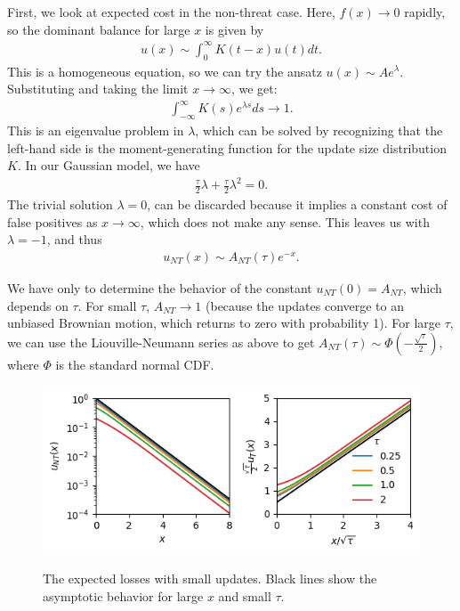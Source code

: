 \documentclass[12pt, letterpaper]{article}
\begin{document}
First, we look at expected cost in the non-threat case. 
Here, $f(x) \to 0$ rapidly, so the dominant balance for large $x$ is given by
\begin{align}
    u(x) \sim \int_0^{\infty} K(t - x) u(t) dt.
\end{align}
This is a homogeneous equation, so we can try the ansatz $u(x) \sim A e^{\lambda}$.
Substituting and taking the limit $x \to \infty$, we get:
\begin{align}
    \int_{-\infty}^{\infty} K(s) e^{\lambda s} ds \to 1.
\end{align}
This is an eigenvalue problem in $\lambda$, which can be solved by recognizing that the left-hand side is the moment-generating function for the update size distribution $K$.
In our Gaussian model, we have
\begin{align}
    \frac{\tau}{2} \lambda + \frac{\tau}{2} \lambda^2 = 0.
\end{align}
The trivial solution $\lambda = 0$, can be discarded because it implies a constant cost of false positives as $x\to \infty$, which does not make any sense.
This leaves us with $\lambda = -1$, and thus
\begin{align}
    u_{NT}(x) \sim A_{NT}(\tau) e^{-x}.
\end{align}

We have only to determine the behavior of the constant $u_{NT}(0) = A_{NT}$, which depends on $\tau$.
For small $\tau$, $A_{NT} \to 1$ (because the updates converge to an unbiased Brownian motion, which returns to zero with probability 1).
For large $\tau$, we can use the Liouville-Neumann series as above to get $A_{NT}(\tau) \sim \Phi(-\frac{\sqrt{\tau}}{2})$, where $\Phi$ is the standard normal CDF.

\begin{figure}
    \centering
    \includegraphics{small_updates}
    \label{fig:small_updates}
    \caption{The expected losses with small updates. Black lines show the asymptotic behavior for large $x$ and small $\tau$.}
\end{figure}
\end{document}

